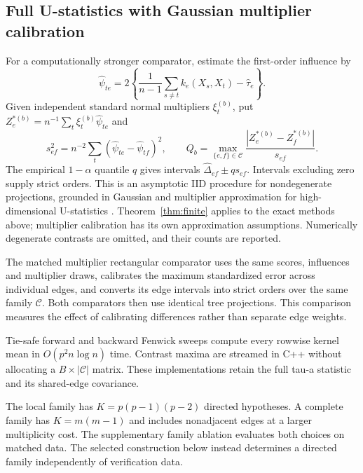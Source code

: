 \subsection{Full U-statistics with Gaussian multiplier calibration}\label{sec:multiplier}
For a computationally stronger comparator, estimate the first-order influence by
\[
 \widehat\psi_{te}=2\left\{\frac1{n-1}\sum_{s\ne t} k_e(X_s,X_t)-\widehat\tau_e\right\}.
\]
Given independent standard normal multipliers $\xi_t^{(b)}$, put $Z_e^{*(b)}=n^{-1}\sum_t\xi_t^{(b)}\widehat\psi_{te}$ and
\[
 s_{ef}^2=n^{-2}\sum_t(\widehat\psi_{te}-\widehat\psi_{tf})^2,\qquad
 Q_b=\max_{\{e,f\}\in\mathcal C}\frac{|Z_e^{*(b)}-Z_f^{*(b)}|}{s_{ef}}.
\]
The empirical $1-\alpha$ quantile $q$ gives intervals $\widehat\Delta_{ef}\pm qs_{ef}$. Intervals excluding zero supply strict orders. This is an asymptotic IID procedure for nondegenerate projections, grounded in Gaussian and multiplier approximation for high-dimensional U-statistics \citep{chen2018,cck2013}. Theorem~\ref{thm:finite} applies to the exact methods above; multiplier calibration has its own approximation assumptions. Numerically degenerate contrasts are omitted, and their counts are reported.

The matched multiplier rectangular comparator uses the same scores, influences and multiplier draws, calibrates the maximum standardized error across individual edges, and converts its edge intervals into strict orders over the same family $\mathcal C$. Both comparators then use identical tree projections. This comparison measures the effect of calibrating differences rather than separate edge weights.

Tie-safe forward and backward Fenwick sweeps compute every rowwise kernel mean in $O(p^2n\log n)$ time. Contrast maxima are streamed in C++ without allocating a $B\times|\mathcal C|$ matrix. These implementations retain the full tau-a statistic and its shared-edge covariance.


The local family has $K=p(p-1)(p-2)$ directed hypotheses. A complete family has $K=m(m-1)$ and includes nonadjacent edges at a larger multiplicity cost. The supplementary family ablation evaluates both choices on matched data. The selected construction below instead determines a directed family independently of verification data.
